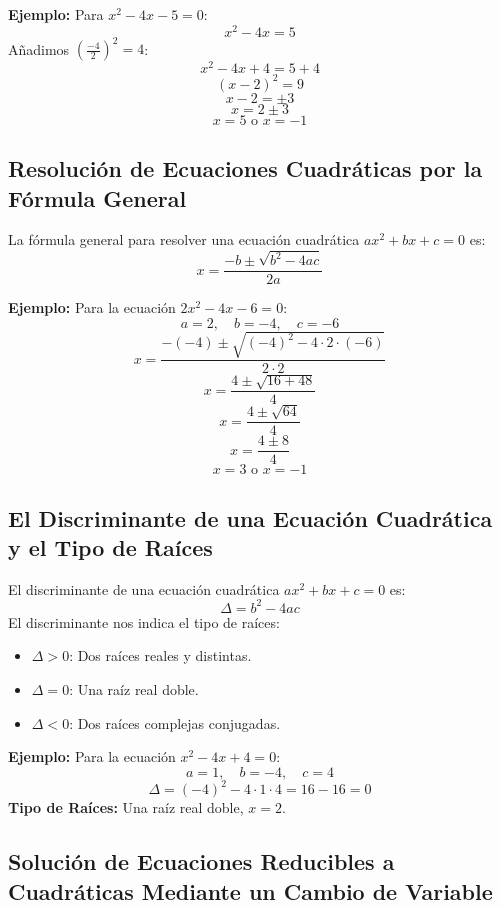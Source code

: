     \textbf{Ejemplo:} Para \(x^2 - 4x - 5 = 0\):
    \[
    x^2 - 4x = 5
    \]
    Añadimos \(\left(\frac{-4}{2}\right)^2 = 4\):
    \[
    x^2 - 4x + 4 = 5 + 4
    \]
    \[
    (x - 2)^2 = 9
    \]
    \[
    x - 2 = \pm 3
    \]
    \[
    x = 2 \pm 3
    \]
    \[
    x = 5 \text{ o } x = -1
    \]
    
    \subsection{Resolución de Ecuaciones Cuadráticas por la Fórmula General}
    
    La fórmula general para resolver una ecuación cuadrática \(ax^2 + bx + c = 0\) es:
    \[
    x = \frac{-b \pm \sqrt{b^2 - 4ac}}{2a}
    \]
    
    \textbf{Ejemplo:} Para la ecuación \(2x^2 - 4x - 6 = 0\):
    \[
    a = 2, \quad b = -4, \quad c = -6
    \]
    \[
    x = \frac{-(-4) \pm \sqrt{(-4)^2 - 4 \cdot 2 \cdot (-6)}}{2 \cdot 2}
    \]
    \[
    x = \frac{4 \pm \sqrt{16 + 48}}{4}
    \]
    \[
    x = \frac{4 \pm \sqrt{64}}{4}
    \]
    \[
    x = \frac{4 \pm 8}{4}
    \]
    \[
    x = 3 \text{ o } x = -1
    \]
    
    \subsection{El Discriminante de una Ecuación Cuadrática y el Tipo de Raíces}
    
    El discriminante de una ecuación cuadrática \(ax^2 + bx + c = 0\) es:
    \[
    \Delta = b^2 - 4ac
    \]
    El discriminante nos indica el tipo de raíces:
    \begin{itemize}
        \item \(\Delta > 0\): Dos raíces reales y distintas.
        \item \(\Delta = 0\): Una raíz real doble.
        \item \(\Delta < 0\): Dos raíces complejas conjugadas.
    \end{itemize}
    
    \textbf{Ejemplo:} Para la ecuación \(x^2 - 4x + 4 = 0\):
    \[
    a = 1, \quad b = -4, \quad c = 4
    \]
    \[
    \Delta = (-4)^2 - 4 \cdot 1 \cdot 4 = 16 - 16 = 0
    \]
    \textbf{Tipo de Raíces:} Una raíz real doble, \(x = 2\).
    
    \subsection{Solución de Ecuaciones Reducibles a Cuadráticas Mediante un Cambio de Variable}
    
